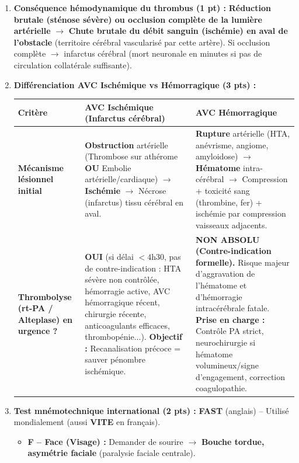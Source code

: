 \documentclass[11pt]{article}
\begin{document}
\begin{corrige}
\begin{enumerate}
\begin{enumerate}
    \end{enumerate}
    \item \textbf{Conséquence hémodynamique du thrombus (1 pt) :}
    \textbf{Réduction brutale (sténose sévère) ou occlusion complète de la lumière artérielle} $\to$ \textbf{Chute brutale du débit sanguin (ischémie) en aval de l'obstacle} (territoire cérébral vascularisé par cette artère). Si occlusion complète $\to$ infarctus cérébral (mort neuronale en minutes si pas de circulation collatérale suffisante).
    \item \textbf{Différenciation AVC Ischémique vs Hémorragique (3 pts) :}
    \begin{center}
    \begin{tabularx}{\linewidth}{|l|X|X|}\hline
    \rowcolor{popblueL}
    \textbf{Critère} & \textbf{AVC Ischémique (Infarctus cérébral)} & \textbf{AVC Hémorragique} \\ \hline
    \textbf{Mécanisme lésionnel initial} & \textbf{Obstruction} artérielle (Thrombose sur athérome \textbf{OU} Embolie artérielle/cardiaque) $\to$ \textbf{Ischémie} $\to$ Nécrose (infarctus) tissu cérébral en aval. & \textbf{Rupture} artérielle (HTA, anévrisme, angiome, amyloidose) $\to$ \textbf{Hématome} intra-cérébral $\to$ Compression + toxicité sang (thrombine, fer) + ischémie par compression vaisseaux adjacents. \\ \hline
    \textbf{Thrombolyse (rt-PA / Alteplase) en urgence ?} & \textbf{OUI} (si délai $< 4$h$30$, pas de contre-indication : HTA sévère non contrôlée, hémorragie active, AVC hémorragique récent, chirurgie récente, anticoagulants efficaces, thrombopénie...). \textbf{Objectif :} Recanalisation précoce = sauver pénombre ischémique. & \textbf{NON ABSOLU (Contre-indication formelle).} Risque majeur d'aggravation de l'hématome et d'hémorragie intracérébrale fatale. \textbf{Prise en charge :} Contrôle PA strict, neurochirurgie si hématome volumineux/signe d'engagement, correction coagulopathie. \\ \hline
    \end{tabularx}
    \end{center}
    \item \textbf{Test mnémotechnique international (2 pts) :}
    \textbf{FAST} (anglais) -- Utilisé mondialement (aussi \textbf{VITE} en français).
    \begin{itemize}
        \item \textbf{F -- Face (Visage) :} Demander de sourire $\to$ \textbf{Bouche tordue, asymétrie faciale} (paralysie faciale centrale).

\end{itemize}
\end{enumerate}
\end{corrige}
\end{document}
